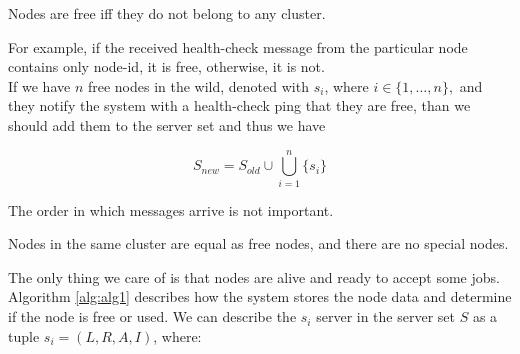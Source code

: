 \begin{definition}
	Nodes are free iff they do not belong to any cluster.
\end{definition}

\noindent 
For example, if the received health-check message from the particular node contains only node-id, it is free, otherwise, it is not.\\ 

If we have $n$ free nodes in the wild, denoted with $s_i$, where $i\in\{1, \ldots, n\},$ and they notify the system with a health-check ping that they are free, than we should add them to the server set and thus we have

\begin{equation}
	S_{\mathit{new}} = S_{\mathit{old}} \cup \bigcup%
	_{i=1}^{n} \{s_i\}
\end{equation}
 
\noindent 
The order in which messages arrive is not important. 

\begin{definition}
	Nodes in the same cluster are equal as free nodes, and there are no special nodes. 
\end{definition}

\noindent
The only thing we care of is that nodes are alive and ready to accept some jobs. \\

Algorithm \ref{alg:alg1} describes how the system stores the node data and determine if the node is free or used.
We can describe the $s_i$ server in the server set $S$ as a tuple $s_i = (L, R, A, I)$, where:

